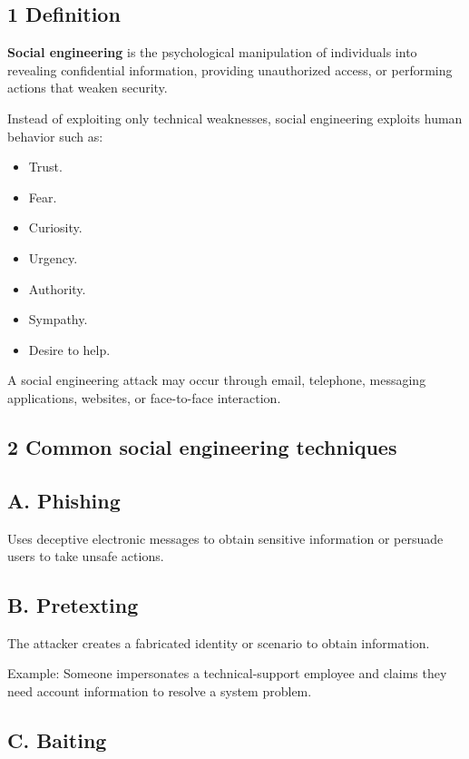 \subsection{1 Definition}

\textbf{Social engineering} is the psychological manipulation of individuals into revealing confidential information, providing unauthorized access, or performing actions that weaken security.

Instead of exploiting only technical weaknesses, social engineering exploits human behavior such as:

\begin{itemize}
\item Trust.
\item Fear.
\item Curiosity.
\item Urgency.
\item Authority.
\item Sympathy.
\item Desire to help.
\end{itemize}

A social engineering attack may occur through email, telephone, messaging applications, websites, or face-to-face interaction.

\subsection{2 Common social engineering techniques}

\subsection{A. Phishing}

Uses deceptive electronic messages to obtain sensitive information or persuade users to take unsafe actions.

\subsection{B. Pretexting}

The attacker creates a fabricated identity or scenario to obtain information.

Example: Someone impersonates a technical-support employee and claims they need account information to resolve a system problem.

\subsection{C. Baiting}

